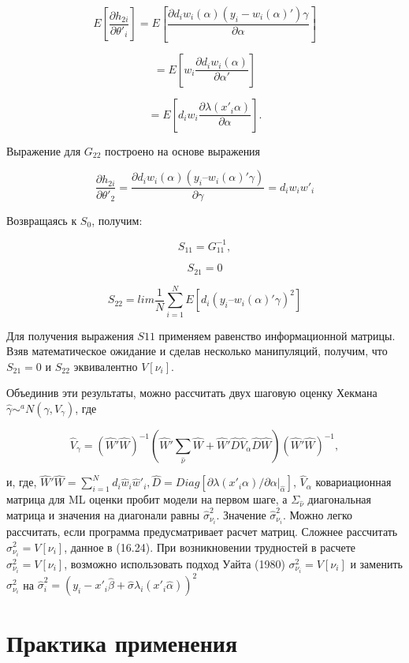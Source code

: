 \[
E\left[\dfrac{{\partial}h_{2i}}{\partial\theta'_{i}}\right]=E \left[\dfrac{\partial d_{i}w_{i}(\alpha)(y_{i}-w_{i}(\alpha)')\gamma}{\partial{\alpha}}\right]
\]

\[
=E\left[w_{i}\dfrac{{\partial}d_{i}w_{i}(\alpha)}{\partial\alpha'}\right]
\]

\[
=E\left[d_{i}w_{i}\dfrac{\partial\lambda(x'_{i}\alpha)}{\partial\alpha}\right].
\]

Выражение для $G_{22}$ построено на основе выражения

\[
\dfrac{\partial h_{2i}}{\partial\theta'_{2}}=\dfrac{{\partial}d_{i}w_{i}(\alpha)(y_i – w_{i}(\alpha)'\gamma)}{\partial\gamma}=d_{i}w_{i}w'_i
\]

Возвращаясь к $S_0$, получим:

\[
S_{11}=G^{-1}_{11},
\]

\[
S_{21}=0
\]

\[
S_{22}=lim\dfrac{1}{N}\sum^{N}_{i=1}E[d_{i}(y_i – w_{i}(\alpha)'\gamma)^2]
\]

Для получения выражения $S{11}$ применяем равенство информационной матрицы. Взяв математическое ожидание и сделав несколько манипуляций, получим, что $S_{21}=0$ и $S_{22}$ эквивалентно $V[\nu_i]$.

Объединив эти результаты, можно рассчитать двух шаговую оценку Хекмана $\hat{\gamma}{\sim}^{a}N(\gamma,V_{\gamma})$, где

\begin{equation}
\hat{V}_{\gamma}=(\hat{W}'\hat{W})^{-1}(\hat{W}'\sum_{\hat{\nu}}\hat{W}+\hat{W}'\hat{D}\hat{V}_{\alpha}\hat{D}\hat{W})(\hat{W}'\hat{W})^{-1},
\end{equation}

и, где, $\hat{W}'\hat{W}=\sum^{N}_{i=1}d_{i}\hat{w}_{i}\hat{w}'_{i},\hat{D}=Diag[\partial\lambda(x'_{i}\alpha)/\partial\alpha|_{\hat{\alpha}}]$, $\hat{V}_{\alpha}$ ковариационная матрица для ML оценки пробит модели на первом шаге, а $\Sigma_{\hat{\nu}}$ диагональная матрица и значения на диагонали равны $\hat{\sigma}^{2}_{\nu_i}$. Значение $\hat{\sigma}^{2}_{\nu_i}$. Можно легко рассчитать, если программа предусматривает расчет матриц. Сложнее рассчитать $\sigma^{2}_{\nu_i}=V[\nu_i]$, данное в (16.24). При возникновении трудностей в расчете $\sigma^{2}_{\nu_i}=V[\nu_i]$, возможно использовать подход Уайта (1980) $\sigma^{2}_{\nu_i}=V[\nu_i]$ и заменить $\sigma^{2}_{\nu_i}$ на $\hat{\sigma}^{2}_{i}=(y_{i}-x'_{i}\hat{\beta}+\hat{\sigma}\lambda_{i}(x'_{i}\hat{\alpha}))^2$

\section{Практика применения}

